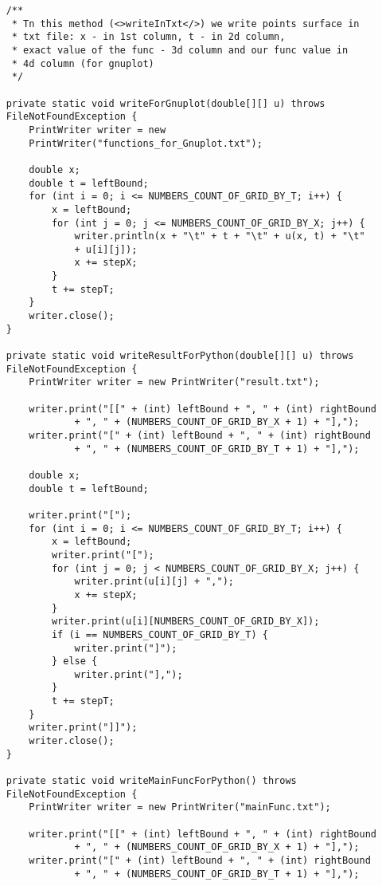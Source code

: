 \begin{verbatim}
    /**
     * Tn this method (<>writeInTxt</>) we write points surface in 
     * txt file: x - in 1st column, t - in 2d column,
     * exact value of the func - 3d column and our func value in 
     * 4d column (for gnuplot)
     */

    private static void writeForGnuplot(double[][] u) throws
    FileNotFoundException {
        PrintWriter writer = new
        PrintWriter("functions_for_Gnuplot.txt");

        double x;
        double t = leftBound;
        for (int i = 0; i <= NUMBERS_COUNT_OF_GRID_BY_T; i++) {
            x = leftBound;
            for (int j = 0; j <= NUMBERS_COUNT_OF_GRID_BY_X; j++) {
                writer.println(x + "\t" + t + "\t" + u(x, t) + "\t" 
                + u[i][j]);
                x += stepX;
            }
            t += stepT;
        }
        writer.close();
    }

    private static void writeResultForPython(double[][] u) throws
    FileNotFoundException {
        PrintWriter writer = new PrintWriter("result.txt");

        writer.print("[[" + (int) leftBound + ", " + (int) rightBound
                + ", " + (NUMBERS_COUNT_OF_GRID_BY_X + 1) + "],");
        writer.print("[" + (int) leftBound + ", " + (int) rightBound
                + ", " + (NUMBERS_COUNT_OF_GRID_BY_T + 1) + "],");

        double x;
        double t = leftBound;

        writer.print("[");
        for (int i = 0; i <= NUMBERS_COUNT_OF_GRID_BY_T; i++) {
            x = leftBound;
            writer.print("[");
            for (int j = 0; j < NUMBERS_COUNT_OF_GRID_BY_X; j++) {
                writer.print(u[i][j] + ",");
                x += stepX;
            }
            writer.print(u[i][NUMBERS_COUNT_OF_GRID_BY_X]);
            if (i == NUMBERS_COUNT_OF_GRID_BY_T) {
                writer.print("]");
            } else {
                writer.print("],");
            }
            t += stepT;
        }
        writer.print("]]");
        writer.close();
    }

    private static void writeMainFuncForPython() throws
    FileNotFoundException {
        PrintWriter writer = new PrintWriter("mainFunc.txt");

        writer.print("[[" + (int) leftBound + ", " + (int) rightBound
                + ", " + (NUMBERS_COUNT_OF_GRID_BY_X + 1) + "],");
        writer.print("[" + (int) leftBound + ", " + (int) rightBound
                + ", " + (NUMBERS_COUNT_OF_GRID_BY_T + 1) + "],");


\end{verbatim}
